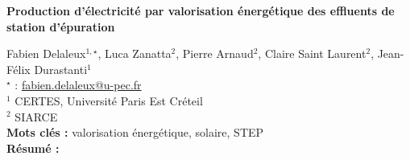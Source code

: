 


    \newpage

\BgThispage

%
\begin{flushleft}
\addtocounter{section}{1}
{\Large \textbf{Production d'électricité par valorisation énergétique des effluents de station d'épuration}}\label{ref:16}
\end{flushleft}
%
Fabien Delaleux$^{1,\star}$, Luca Zanatta$^{2}$, Pierre Arnaud$^{2}$, Claire Saint Laurent$^{2}$, Jean-Félix Durastanti$^{1}$\\[2mm]
$^{\star}$ \Letter : \url{fabien.delaleux@u-pec.fr}\\[2mm]
{\footnotesize $^{1}$ CERTES, Université Paris Est Créteil}\\
{\footnotesize $^{2}$ SIARCE}\\
[4mm]
%
\noindent \textbf{Mots clés : } valorisation énergétique, solaire, STEP\\[4mm]
%
\noindent \textbf{Résumé : } 

